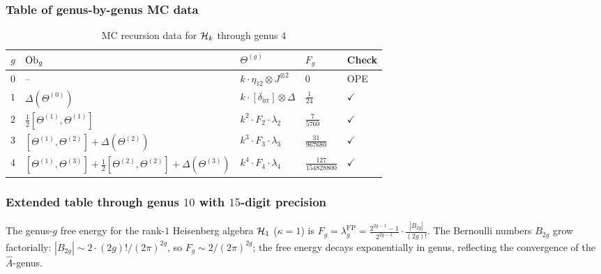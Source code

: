 \subsubsection{Table of genus-by-genus MC data}

\begin{table}[ht]
\centering
\caption{MC recursion data for $\mathcal{H}_k$ through genus $4$}
\begin{tabular}{cllll}
\hline
$g$ & $\mathrm{Ob}_g$ & $\Theta^{(g)}$ & $F_g$ & Check \\
\hline
$0$ & -- & $k \cdot \eta_{12} \otimes J^{\otimes 2}$ &
 $0$ & OPE \\
$1$ & $\Delta(\Theta^{(0)})$ &
 $k \cdot [\delta_{\mathrm{irr}}] \otimes \Delta$ &
 $\frac{1}{24}$ & $\checkmark$ \\
$2$ & $\frac{1}{2}[\Theta^{(1)},\Theta^{(1)}]$ &
 $k^2 \cdot F_2 \cdot \lambda_2$ &
 $\frac{7}{5760}$ & $\checkmark$ \\
$3$ & $[\Theta^{(1)},\Theta^{(2)}] + \Delta(\Theta^{(2)})$ &
 $k^3 \cdot F_3 \cdot \lambda_3$ &
 $\frac{31}{967680}$ & $\checkmark$ \\
$4$ & $[\Theta^{(1)},\Theta^{(3)}]
 + \frac{1}{2}[\Theta^{(2)},\Theta^{(2)}]
 + \Delta(\Theta^{(3)})$ &
 $k^4 \cdot F_4 \cdot \lambda_4$ &
 $\frac{127}{154828800}$ & $\checkmark$ \\
\hline
\end{tabular}
\end{table}

\subsubsection{Extended table through genus $10$ with $15$-digit precision}

The genus-$g$ free energy for the rank-$1$ Heisenberg algebra
$\mathcal{H}_1$ ($\kappa = 1$) is
$F_g = \lambda_g^{\mathrm{FP}}
= \frac{2^{2g-1}-1}{2^{2g-1}} \cdot \frac{|B_{2g}|}{(2g)!}$.
The Bernoulli numbers $B_{2g}$ grow factorially:
$|B_{2g}| \sim 2 \cdot (2g)! / (2\pi)^{2g}$, so
$F_g \sim 2/(2\pi)^{2g}$; the free energy decays
exponentially in genus, reflecting the convergence of
the $\hat{A}$-genus.

